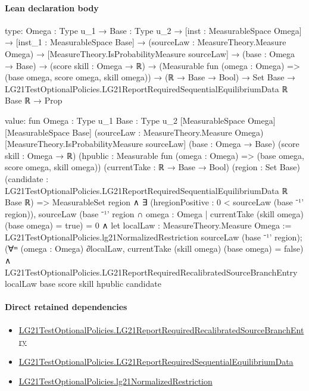 \documentclass[10pt]{article}
\begin{document}
\paragraph{Lean declaration body}
\begin{ReviewVerbatim}
type:
{Omega : Type u_1} →
  {Base : Type u_2} →
    [inst : MeasurableSpace Omega] →
      [inst_1 : MeasurableSpace Base] →
        (sourceLaw : MeasureTheory.Measure Omega) →
          [MeasureTheory.IsProbabilityMeasure sourceLaw] →
            (base : Omega → Base) →
              (score skill : Omega → ℝ) →
                (Measurable fun (omega : Omega) => (base omega, score omega, skill omega)) →
                  (ℝ → Base → Bool) →
                    Set Base → LG21TestOptionalPolicies.LG21ReportRequiredSequentialEquilibriumData ℝ Base ℝ → Prop

value:
fun {Omega : Type u_1} {Base : Type u_2} [MeasurableSpace Omega] [MeasurableSpace Base]
    (sourceLaw : MeasureTheory.Measure Omega) [MeasureTheory.IsProbabilityMeasure sourceLaw] (base : Omega → Base)
    (score skill : Omega → ℝ) (hpublic : Measurable fun (omega : Omega) => (base omega, score omega, skill omega))
    (currentTake : ℝ → Base → Bool) (region : Set Base)
    (candidate : LG21TestOptionalPolicies.LG21ReportRequiredSequentialEquilibriumData ℝ Base ℝ) =>
  MeasurableSet region ∧
    ∃ (hregionPositive : 0 < sourceLaw (base ⁻¹' region)),
      sourceLaw (base ⁻¹' region ∩ {omega : Omega | currentTake (skill omega) (base omega) = true}) = 0 ∧
        let localLaw : MeasureTheory.Measure Omega :=
          LG21TestOptionalPolicies.lg21NormalizedRestriction sourceLaw (base ⁻¹' region);
        (∀ᵐ (omega : Omega) ∂localLaw, currentTake (skill omega) (base omega) = false) ∧
          LG21TestOptionalPolicies.LG21ReportRequiredRecalibratedSourceBranchEntry localLaw base score skill hpublic
            candidate
\end{ReviewVerbatim}

\paragraph{Direct retained dependencies}
\begin{itemize}\raggedright
\item \hyperlink{governing-declaration-7546a3c2870940ca}{LG21\allowbreak{}Test\allowbreak{}Optional\allowbreak{}Policies.\allowbreak{}LG21\allowbreak{}Report\allowbreak{}Required\allowbreak{}Recalibrated\allowbreak{}Source\allowbreak{}Branch\allowbreak{}Entry}
\item \hyperlink{governing-declaration-b4426f8407925151}{LG21\allowbreak{}Test\allowbreak{}Optional\allowbreak{}Policies.\allowbreak{}LG21\allowbreak{}Report\allowbreak{}Required\allowbreak{}Sequential\allowbreak{}Equilibrium\allowbreak{}Data}
\item \hyperlink{governing-declaration-ee825e256b6d452b}{LG21\allowbreak{}Test\allowbreak{}Optional\allowbreak{}Policies.\allowbreak{}lg21\allowbreak{}Normalized\allowbreak{}Restriction}
\end{itemize}
\hypertarget{governing-declaration-aef28999a0b108d6}{}
\end{document}
